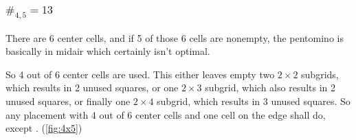 \documentclass{article}
\newcommand{\pentP}{\smash{\colorbox{colorP!50}{P}}}
\theoremstyle{definition}%
\begin{document}
\subsubsection{$\#_{4,5} = 13$}

There are 6 center cells, and if 5 of those 6 cells are nonempty, the pentomino is basically in midair which certainly isn't optimal.

So 4 out of 6 center cells are used. This either leaves empty two $2 \times 2$ subgrids, which results in 2 unused squares, or one $2 \times 3$ subgrid, which also results in 2 unused squares, or finally one $2 \times 4$ subgrid, which results in 3 unused squares. So any placement with 4 out of 6 center cells and one cell on the edge shall do, except \pentP. (\cref{fig:4x5})

\begin{figure}[htbp!]
    \centering
\end{figure}
\end{document}

